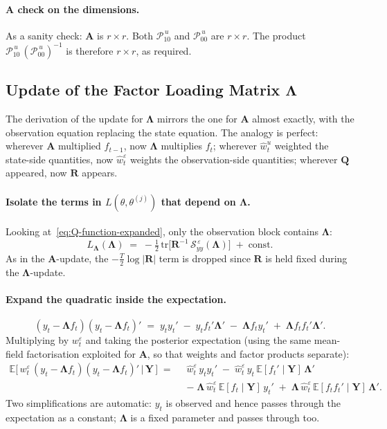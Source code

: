 \documentclass[11pt, a4paper, oneside]{article}
\newcommand{\mY}{\mathbf{Y}}
\newcommand{\mL}{\boldsymbol{\Lambda}}
\newcommand{\mA}{\mathbf{A}}
\newcommand{\mR}{\mathbf{R}}
\newcommand{\mQ}{\mathbf{Q}}
\begin{document}
\paragraph{A check on the dimensions.}
As a sanity check: $\mA$ is $r \times r$. Both
$\mathcal{P}_{10}^{\,u}$ and $\mathcal{P}_{00}^{\,u}$ are
$r \times r$. The product $\mathcal{P}_{10}^{\,u}\, (\mathcal{P}_{00}^{\,u})^{-1}$
is therefore $r \times r$, as required.

\subsection{Update of the Factor Loading Matrix \texorpdfstring{$\mL$}{Lambda}}
\label{subsec:update-Lambda}

The derivation of the update for $\mL$ mirrors the one
for $\mathbf{A}$ almost exactly, with the observation equation
replacing the state equation. The analogy is perfect: wherever
$\mathbf{A}$ multiplied $f_{t-1}$, now $\mL$ multiplies
$f_t$; wherever $\hat{w}^u_t$ weighted the state-side quantities,
now $\hat{w}^\varepsilon_t$ weights the observation-side quantities;
wherever $\mQ$ appeared, now $\mR$ appears.

\paragraph{Isolate the terms in $L(\theta, \theta^{(j)})$ that depend on $\mL$.}
Looking at~\eqref{eq:Q-function-expanded}, only the observation block
contains $\mL$:
\begin{equation}
L_{\mL}(\mL) \;=\; -\tfrac{1}{2}\,\mathrm{tr}\!\Big[\mR^{-1}\, \mathcal{S}_{yy}^{\,\varepsilon}(\mL)\Big]
\;+\; \text{const}.
\label{eq:L-Lambda-step1}
\end{equation}
As in the $\mA$-update, the $-\tfrac{T}{2}\log|\mR|$ term is dropped
since $\mR$ is held fixed during the $\mL$-update.

\paragraph{Expand the quadratic inside the expectation.}
\[
(y_t - \mL f_t)(y_t - \mL f_t)'
\;=\; y_t y_t' \;-\; y_t f_t' \mL' \;-\; \mL f_t y_t' \;+\; \mL f_t f_t' \mL'.
\]
Multiplying by $w^\varepsilon_t$ and taking the posterior expectation
(using the same mean-field factorisation exploited for $\mA$, so that
weights and factor products separate):
\begin{align*}
\mathbb{E}\!\big[\, w^\varepsilon_t\, (y_t - \mL f_t)(y_t - \mL f_t)' \,\big|\, \mY\,\big]
\;=\;\;
& \hat{w}^\varepsilon_t\, y_t y_t'
\;-\; \hat{w}^\varepsilon_t\, y_t\, \mathbb{E}[f_t' \mid \mY]\, \mL' \\[2pt]
& -\; \mL\, \hat{w}^\varepsilon_t\, \mathbb{E}[f_t \mid \mY]\, y_t'
\;+\; \mL\, \hat{w}^\varepsilon_t\, \mathbb{E}[f_t f_t' \mid \mY]\, \mL'.
\end{align*}
Two simplifications are automatic: $y_t$ is observed and hence passes
through the expectation as a constant; $\mL$ is a fixed
parameter and passes through too.
\end{document}

